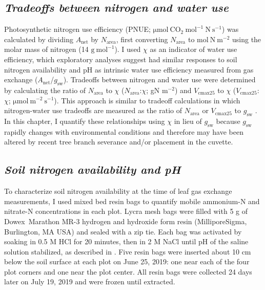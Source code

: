 \subsection{\textit{Tradeoffs between nitrogen and water use}}
\noindent Photosynthetic nitrogen use efficiency (PNUE; $\mathrm{\mu mol\ CO_2\ mol^{-1}\ N\ s^{-1}}$) was calculated by dividing $A_\mathrm{net}$ by $N_\mathrm{area}$, first converting $N_\mathrm{area}$ to $\mathrm{mol\ N\ m^{-2}}$ using the molar mass of nitrogen (14 $\mathrm{g\ mol^{-1}}$). I used $\chi$ as an indicator of water use efficiency, which exploratory analyses suggest had similar responses to soil nitrogen availability and pH as intrinsic water use efficiency measured from gas exchange ($A_\mathrm{net}$/$g_\mathrm{sw}$). Tradeoffs between nitrogen and water use were determined by calculating the ratio of $N_\mathrm{area}$ to $\chi$ ($N_\mathrm{area}$:$\chi$; gN m$^{-2}$) and $V_\mathrm{cmax25}$ to $\chi$ ($V_\mathrm{cmax25}$:$\chi$; $\mathrm{\mu mol\ m^{-2}\ s^{-1}}$). This approach is similar to tradeoff calculations in which nitrogen-water use tradeoffs are measured as the ratio of $N_\mathrm{area}$ or $V_\mathrm{cmax25}$ to $g_\mathrm{sw}$ . In this chapter, I quantify these relationships using $\chi$ in lieu of $g_\mathrm{sw}$ because $g_\mathrm{sw}$ rapidly changes with environmental conditions and therefore may have been altered by recent tree branch severance and/or placement in the cuvette.

\subsection{\textit{Soil nitrogen availability and pH}}
\noindent To characterize soil nitrogen availability at the time of leaf gas exchange measurements, I used mixed bed resin bags to quantify mobile ammonium-N and nitrate-N concentrations in each plot. Lycra mesh bags were filled with 5 g of Dowex\textregistered\ Marathon MR-3 hydrogen and hydroxide form resin (MilliporeSigma, Burlington, MA USA) and sealed with a zip tie. Each bag was activated by soaking in 0.5 M HCl for 20 minutes, then in 2 M NaCl until pH of the saline solution stabilized, as described in . Five resin bags were inserted about 10 cm below the soil surface at each plot on June 25, 2019: one near each of the four plot corners and one near the plot center. All resin bags were collected 24 days later on July 19, 2019 and were frozen until extracted.
    
